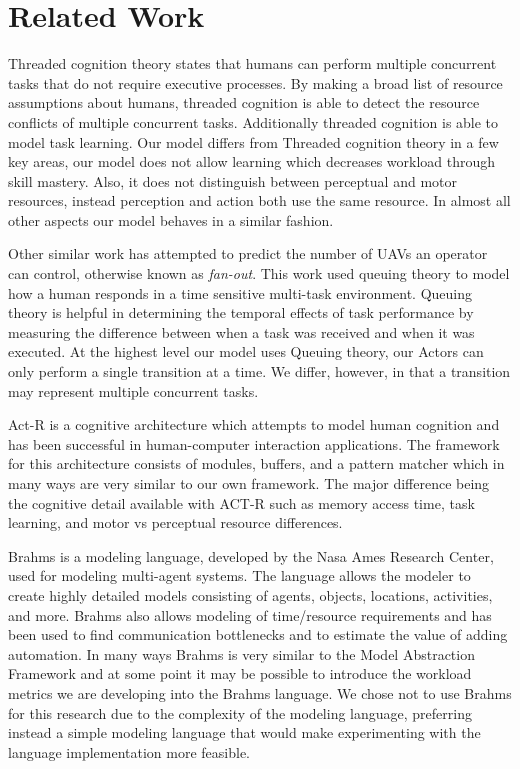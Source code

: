 \chapter{Related Work} \label{ch:relatedwork}

Threaded cognition theory states that humans can perform
multiple concurrent tasks that do not require executive processes.  By making a
broad list of resource assumptions about humans, threaded cognition is able to
detect the resource conflicts of multiple concurrent tasks.  Additionally
threaded cognition is able to model task learning.  Our model differs from
Threaded cognition theory in a few key areas, our model does not allow learning
which decreases workload through skill mastery.  Also, it does not distinguish
between perceptual and motor resources, instead perception and action both use
the same resource.  In almost all other aspects our model behaves in a similar fashion. \cite{salvucci2008threaded}

Other similar work has attempted to predict the number of UAVs an operator can
control, otherwise known as {\em fan-out}. \cite{cummings2007predicting}  This work used queuing theory
to model how a human responds in a time sensitive multi-task environment.  Queuing theory is helpful in determining the temporal effects of task performance by measuring the difference between when a task was received and when it was executed.  At the highest level our model uses Queuing theory, our Actors can only perform a single transition at a time.  We differ, however, in that a transition may represent multiple concurrent tasks.

Act-R is a cognitive architecture which attempts to model human cognition and
has been successful in human-computer interaction applications. \cite{anderson2004integrated}  The
framework for this architecture consists of modules, buffers, and a pattern
matcher which in many ways are very similar to our own framework.  The major
difference being the cognitive detail available with ACT-R such as memory access
time, task learning, and motor vs perceptual resource differences.
\cite{moray1982subjective,newell1994unified}

Brahms is a modeling language, developed by the Nasa Ames Research Center, used for modeling multi-agent systems. \cite{clancey1998brahms}  The language allows the modeler to create highly detailed models consisting of agents, objects, locations, activities, and more.  Brahms also allows modeling of time/resource requirements and has been used to find communication bottlenecks and to estimate the value of adding automation.  In many ways Brahms is very similar to the Model Abstraction Framework and at some point it may be possible to introduce the workload metrics we are developing into the Brahms language.  We chose not to use Brahms for this research due to the complexity of the modeling language, preferring instead a simple modeling language that would make experimenting with the language implementation more feasible.